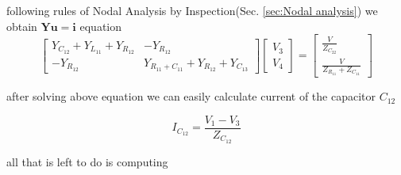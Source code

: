 \documentclass[notitlepage, a4paper, 11pt]{article}
\begin{document}
	following rules of Nodal Analysis by Inspection(Sec. \ref{sec:Nodal analysis}) we obtain $\mathbf{Yu=i}$ equation
		\begin{equation} \label{eq:cA}
			\begin{bmatrix}
				Y_{C_{12}} + Y_{L_{11}} + Y_{R_{12}} & -Y_{R_{12}} \\
				-Y_{R_{12}} & Y_{R_{11}+C_{11}} + Y_{R_{12}} + Y_{C_{13}}
			\end{bmatrix}
			\begin{bmatrix}
				V_3\\
				V_4
			\end{bmatrix}
			=
			\begin{bmatrix}
				\frac{V}{Z_{C_{22}}}\\
				\frac{V}{Z_{R_{11}}+Z_{C_{11}}}
			\end{bmatrix}
		\end{equation}
%	
	
	after solving above equation we can easily calculate current of the capacitor $C_{12}$
	
	\begin{equation}
		I_{C_{12}} = \frac{V_1 - V_3}{Z_{C_{12}}}
	\end{equation}

	all that is left to do is computing	
\end{document}
